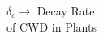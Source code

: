 \documentclass[preview]{standalone}
\begin{document}
\begin{center}
$\delta_c \rightarrow$ Decay Rate\\of CWD in Plants
\end{center}
\end{document}
